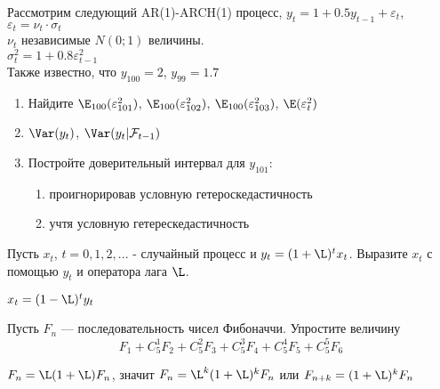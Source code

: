
\begin{problem}
Рассмотрим следующий AR(1)-ARCH(1) процесс, 
$y_{t}=1+0.5y_{t-1}+\varepsilon_{t}$, $\varepsilon_{t}=\nu_{t}\cdot \sigma_{t}$ \\
$\nu_{t}$ независимые $N(0;1)$ величины. \\
$\sigma^{2}_{t}=1+0.8\varepsilon^{2}_{t-1}$\\
Также известно, что $y_{100}=2$, $y_{99}=1.7$ 
\begin{enumerate}
\item Найдите $\E_{100}(\varepsilon^{2}_{101})$, $\E_{100}(\varepsilon^{2}_{102})$, $\E_{100}(\varepsilon^{2}_{103})$, $\E(\varepsilon^{2}_{t})$ 
\item $\Var(y_{t})$, $\Var(y_{t}|\mathcal{F}_{t-1})$ 
\item Постройте доверительный интервал для $y_{101}$:
\begin{enumerate}
\item проигнорировав условную гетероскедастичность 
\item учтя условную гетерескедастичность 
\end{enumerate} 
\end{enumerate} 
\end{problem}

\begin{solution}
\end{solution}



\begin{problem}
Пусть $x_{t}$, $t=0,1,2,...$ - случайный процесс и $y_{t}=(1+\L )^{t}x_{t}$.
Выразите $x_{t}$ с помощью $y_{t}$ и оператора лага $\L $.
\end{problem}

\begin{solution}
$x_{t}=(1-\L )^{t}y_{t}$
\end{solution}


\begin{problem}
Пусть $ F_{n} $ --- последовательность чисел Фибоначчи. Упростите величину
\[ F_{1}+C^{1}_{5}F_{2}+C^{2}_{5}F_{3}+C^{3}_{5}F_{4}+C^{4}_{5}F_{5}+C^{5}_{5}F_{6} \]
\end{problem}

\begin{solution}
$ F_{n}=\L (1+\L )F_{n} $, значит $ F_{n}=\L ^{k}(1+\L )^{k}F_{n} $ или $ F_{n+k}=(1+\L )^{k}F_{n} $
\end{solution}



